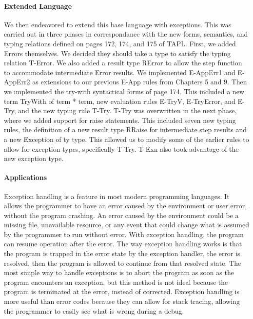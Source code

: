 \documentclass{article}
\begin{document}
\paragraph{Extended Language}
We then endeavored to extend this base language with exceptions. This was carried out in three phases in correspondance with the new forms, semantics, and typing relations defined on pages 172, 174, and 175 of TAPL. First, we added Errors themselves. We decided they should take a type to satisfy the typing relation T-Error. We also added a result type RError to allow the step function to accommodate intermediate Error results. We implemented E-AppErr1 and E-AppErr2 as extensions to our previous E-App rules from Chapters 5 and 9. Then we implemented the try-with syntactical forms of page 174. This included a new term TryWith of term * term, new evaluation rules E-TryV, E-TryError, and E-Try, and the new typing rule T-Try. T-Try was overwritten in the next phase, where we added support for raise statements. This included seven new typing rules, the definition of a new result type RRaise for intermediate step results and a new Exception of ty type. This allowed us to modify some of the earlier rules to allow for exception types, specifically T-Try. T-Exn also took advantage of the new exception type.
\paragraph{Applications}
Exception handling is a feature in most modern programming languages. It allows the programmer to have an error caused by the environment or user error, without the program crashing. An error caused by the environment could be a missing file, unavailable resource, or any event that could change what is assumed by the programmer to run without error. With exception handling, the program can resume operation after the error. The way exception handling works is that the program is trapped in the error state by the exception handler, the error is resolved, then the program is allowed to continue from that resolved state. The most simple way to handle exceptions is to abort the program as soon as the program encounters an exception, but this method is not ideal because the program is terminated at the error, instead of corrected. Exception handling is more useful than error codes because they can allow for stack tracing, allowing the programmer to easily see what is wrong during a debug.
\end{document}
